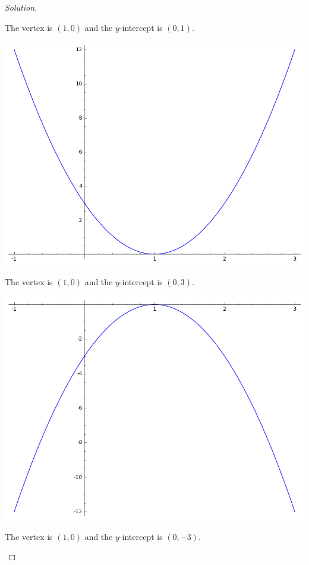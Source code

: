 \documentclass[12pt]{amsart}
\theoremstyle{definition}
\begin{document}
\begin{proof}[Solution]
\begin{center}
  \end{center}
  The vertex is $(1,0)$ and the $y$-intercept is $(0,1)$.
  \begin{center}
    \includegraphics[scale=0.5]{parabolaStretched.png}
  \end{center}
  The vertex is $(1,0)$ and the $y$-intercept is $(0,3)$.
  \begin{center}
    \includegraphics[scale=0.5]{parabolaFlipped.png}
  \end{center}
  The vertex is $(1,0)$ and the $y$-intercept is $(0,-3)$.
  \begin{center}

\end{center}
\end{proof}
\end{document}
